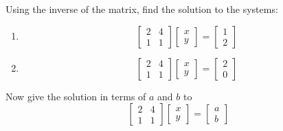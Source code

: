 \documentclass{ximera}
\begin{document}
\begin{problem}\label{prb:4.44}Using the inverse of the matrix, find the solution to the systems:
\begin{enumerate}
\item
\begin{equation*}
\left[
\begin{array}{rr}
2 & 4  \\
1 & 1
\end{array}
\right]
\left[
\begin{array}{c}
x \\
y
\end{array}
\right] =\left[
\begin{array}{r}
1 \\
2
\end{array}
\right]
\end{equation*}

\item
\begin{equation*}
\left[
\begin{array}{rr}
2 & 4 \\
1 & 1
\end{array}
\right] \left[
\begin{array}{c}
x \\
y
\end{array}
\right] =\left[
\begin{array}{r}
2 \\
0
\end{array}
\right]
\end{equation*}
\end{enumerate}

\item Now give the solution in terms of $a$ and $b$ to
\[
\left[
\begin{array}{rr}
2 & 4 \\
1 & 1
\end{array} \right]
\left[
\begin{array}{c}
x \\
y
\end{array}\right]
=
\left[
\begin{array}{c}
a \\
b
\end{array} \right]
\]
\end{problem}
\end{document}
